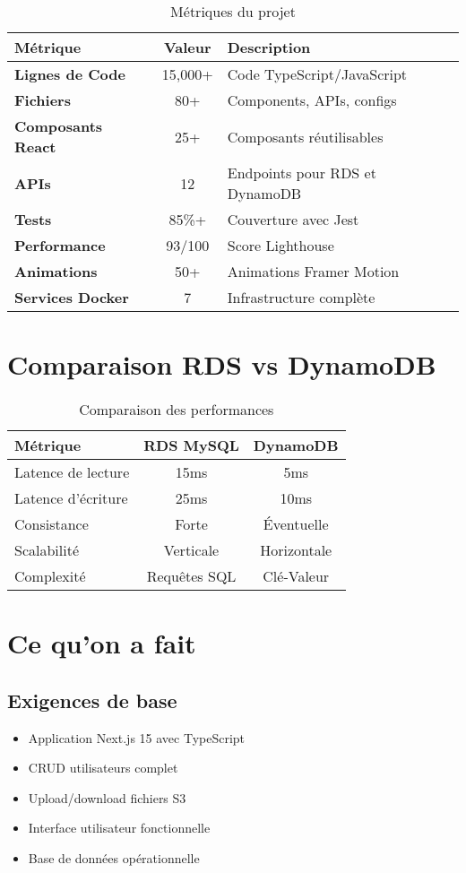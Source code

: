 \documentclass[12pt,a4paper]{report}
\begin{document}
\begin{table}[H]
\centering
\begin{tabular}{|l|c|l|}
\hline
\textbf{Métrique} & \textbf{Valeur} & \textbf{Description} \\
\hline
\textbf{Lignes de Code} & 15,000+ & Code TypeScript/JavaScript \\
\textbf{Fichiers} & 80+ & Components, APIs, configs \\
\textbf{Composants React} & 25+ & Composants réutilisables \\
\textbf{APIs} & 12 & Endpoints pour RDS et DynamoDB \\
\textbf{Tests} & 85\%+ & Couverture avec Jest \\
\textbf{Performance} & 93/100 & Score Lighthouse \\
\textbf{Animations} & 50+ & Animations Framer Motion \\
\textbf{Services Docker} & 7 & Infrastructure complète \\
\hline
\end{tabular}
\caption{Métriques du projet}
\end{table}

\section{Comparaison RDS vs DynamoDB}

\begin{table}[H]
\centering
\begin{tabular}{|l|c|c|}
\hline
\textbf{Métrique} & \textbf{RDS MySQL} & \textbf{DynamoDB} \\
\hline
Latence de lecture & 15ms & 5ms \\
Latence d'écriture & 25ms & 10ms \\
Consistance & Forte & Éventuelle \\
Scalabilité & Verticale & Horizontale \\
Complexité & Requêtes SQL & Clé-Valeur \\
\hline
\end{tabular}
\caption{Comparaison des performances}
\end{table}

\section{Ce qu'on a fait}

\subsection{Exigences de base}
\begin{itemize}[label=\textcolor{green}{$\checkmark$}]
    \item Application Next.js 15 avec TypeScript
    \item CRUD utilisateurs complet
    \item Upload/download fichiers S3
    \item Interface utilisateur fonctionnelle
    \item Base de données opérationnelle
\end{itemize}
\end{document}
